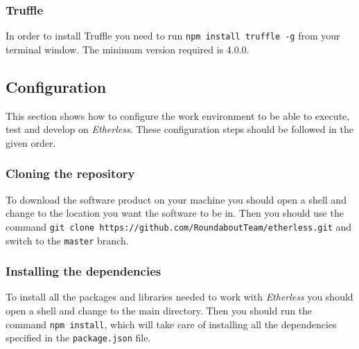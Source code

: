 \subsubsection{Truffle}
 In order to install Truffle you need to run \texttt{npm install truffle -g} from your terminal window. The minimum version required is 4.0.0.
\subsection{Configuration}
This section shows how to configure the work environment to be able to execute, test and develop on \textit{Etherless}. These configuration steps should be followed in the given order.
\subsubsection{Cloning the repository}
To download the software product on your machine you should open a shell and change to the location you want the software to be in. Then you should use the command \texttt{git clone https://github.com/RoundaboutTeam/etherless.git} and switch to the \texttt{master} branch.
\subsubsection{Installing the dependencies}
To install all the packages and libraries needed to work with \textit{Etherless} you should open a shell and change to the main directory. Then you should run the command \texttt{npm install}, which will take care of installing all the dependencies specified in the \texttt{package.json} file.
